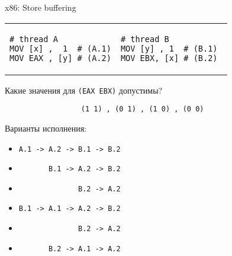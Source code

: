 \begin{frame}{x86: Store buffering}

\begin{tabular}{p{} p{}}
\begin{verbatim}
# thread A
MOV [x] ,  1  # (A.1)
MOV EAX , [y] # (A.2)
\end{verbatim}

& 

\begin{verbatim}
# thread B          
MOV [y] , 1  # (B.1) 
MOV EBX, [x] # (B.2) 
\end{verbatim}
\end{tabular}

\pause
Какие значения для \texttt{(EAX EBX)} допустимы?

\texttt{\ \ \ \ \ \ \ \ \ \ \ \ \ \ \ \ \ \ (1 1)\ , (0 1)\ , (1 0)\ , (0 0)}

\pause
Варианты исполнения:
\begin{itemize}
    \item \texttt{A.1 -> A.2 -> B.1 -> B.2}
    \item \texttt{\ \ \ \ \ \ \       B.1 -> A.2 -> B.2}
    \item \texttt{\ \ \ \ \ \ \ \ \ \ \ \ \ \              B.2 -> A.2}
    \item \texttt{B.1 -> A.1 -> A.2 -> B.2}
    \item \texttt{\ \ \ \ \ \ \ \ \ \ \ \ \ \              B.2 -> A.2}
    \item \texttt{\ \ \ \ \ \ \       B.2 -> A.1 -> A.2}
\end{itemize}
\end{frame}


